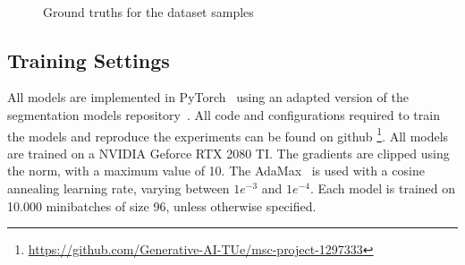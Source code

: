 \begin{figure}
    \centering
    \\
    \caption{\label{fig:coco-samples}Ground truths for the dataset samples}
\end{figure}


\subsection{Training Settings}
All models are implemented in PyTorch~\cite{Ansel_PyTorch_2_Faster_2024} using an adapted version of the segmentation models repository~\cite{Iakubovskii:2019}. All code and configurations required to train the models and reproduce the experiments can be found on github \footnote[1]{\url{https://github.com/Generative-AI-TUe/msc-project-1297333}}. All models are trained on a NVIDIA Geforce RTX 2080 TI. The gradients are clipped using the norm, with a maximum value of 10. The AdaMax~\cite{kingma2017adammethodstochasticoptimization} is used with a cosine annealing learning rate, varying between $1e^{-3}$ and $1e^{-4}$. Each model is trained on 10.000 minibatches of size 96, unless otherwise specified.

